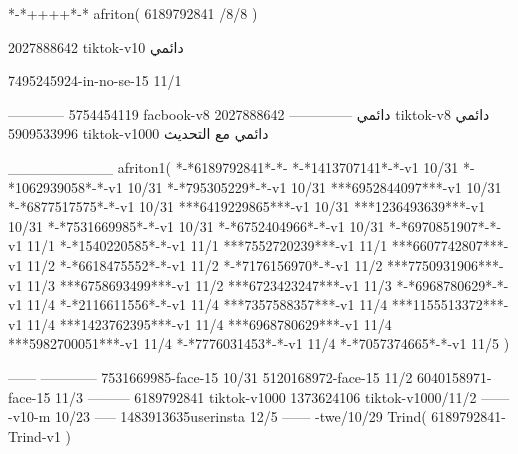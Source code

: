 *-*++++*-*
afriton(
6189792841 /8/8
)

2027888642 tiktok-v10
دائمي


7495245924-in-no-se-15 11/1

------------
5754454119 facbook-v8
دائمي
--------------
2027888642 tiktok-v8
دائمي
5909533996 tiktok-v1000
دائمي مع التحديث

__________
afriton1(
*-*6189792841*-*-
*-*1413707141*-*-v1 10/31
*-*1062939058*-*-v1 10/31
*-*795305229*-*-v1 10/31
***6952844097***-v1 10/31
*-*6877517575*-*-v1 10/31
***6419229865***-v1 10/31
***1236493639***-v1 10/31
*-*7531669985*-*-v1 10/31
*-*6752404966*-*-v1 10/31
*-*6970851907*-*-v1 11/1
*-*1540220585*-*-v1 11/1
***7552720239***-v1 11/1
***6607742807***-v1 11/2
*-*6618475552*-*-v1 11/2
*-*7176156970*-*-v1 11/2
***7750931906***-v1 11/3
***6758693499***-v1 11/2
***6723423247***-v1 11/3
*-*6968780629*-*-v1 11/4
*-*2116611556*-*-v1 11/4
***7357588357***-v1 11/4
***1155513372***-v1 11/4
***1423762395***-v1 11/4
***6968780629***-v1 11/4
***5982700051***-v1 11/4
*-*7776031453*-*-v1 11/4
*-*7057374665*-*-v1 11/5
)

------
------------
7531669985-face-15 10/31
5120168972-face-15 11/2
6040158971-face-15 11/3
---------
6189792841 tiktok-v1000
1373624106 tiktok-v1000/11/2
------
-v10-m 10/23
-----
1483913635userinsta 12/5
------
-twe/10/29
Trind(
6189792841-Trind-v1 
)
